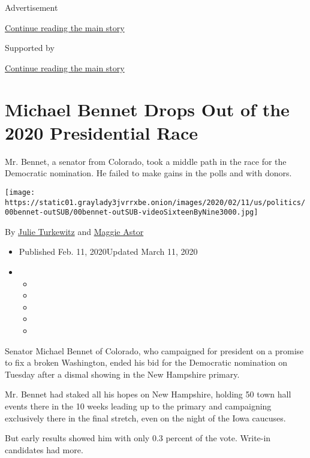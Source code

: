 Advertisement

\protect\hyperlink{after-top}{Continue reading the main story}

Supported by

\protect\hyperlink{after-sponsor}{Continue reading the main story}

\hypertarget{michael-bennet-drops-out-of-the-2020-presidential-race}{%
\section{Michael Bennet Drops Out of the 2020 Presidential
Race}\label{michael-bennet-drops-out-of-the-2020-presidential-race}}

Mr. Bennet, a senator from Colorado, took a middle path in the race for
the Democratic nomination. He failed to make gains in the polls and with
donors.

\texttt{[image: https://static01.graylady3jvrrxbe.onion/images/2020/02/11/us/politics/00bennet-outSUB/00bennet-outSUB-videoSixteenByNine3000.jpg]}

By \href{https://www.nytimes3xbfgragh.onion/by/julie-turkewitz}{Julie
Turkewitz} and
\href{https://www.nytimes3xbfgragh.onion/by/maggie-astor}{Maggie Astor}

\begin{itemize}
\item
  Published Feb. 11, 2020Updated March 11, 2020
\item
  \begin{itemize}
  \item
  \item
  \item
  \item
  \item
  \end{itemize}
\end{itemize}

Senator Michael Bennet of Colorado, who campaigned for president on a
promise to fix a broken Washington, ended his bid for the Democratic
nomination on Tuesday after a dismal showing in the New Hampshire
primary.

Mr. Bennet had staked all his hopes on New Hampshire, holding 50 town
hall events there in the 10 weeks leading up to the primary and
campaigning exclusively there in the final stretch, even on the night of
the Iowa caucuses.

But early results showed him with only 0.3 percent of the vote. Write-in
candidates had more.

